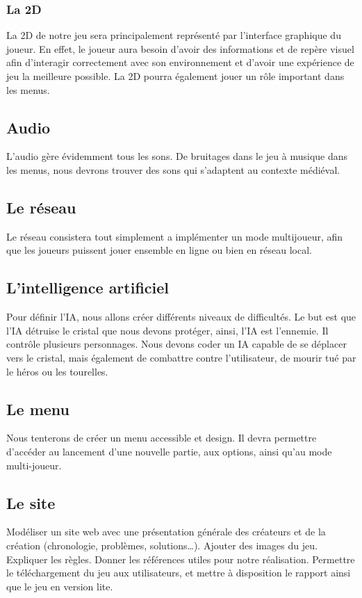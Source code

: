 \documentclass[a4paper, 12pt]{article}
\begin{document}
		\subsubsection{La 2D}
		La 2D de notre jeu sera principalement représenté par l'interface graphique du joueur. En effet, le joueur aura besoin d'avoir des informations et de repère visuel afin d'interagir correctement avec son environnement et d'avoir une expérience de jeu la meilleure possible. La 2D pourra également jouer un rôle important dans les menus.
	\subsection{Audio}
	L’audio gère évidemment tous les sons. De bruitages dans le jeu à musique dans les menus, nous devrons trouver des sons qui s’adaptent au contexte médiéval.

	\subsection{Le réseau}
	Le réseau consistera tout simplement a implémenter un mode multijoueur, afin que les joueurs puissent jouer ensemble en ligne ou bien en réseau local.
	\subsection{L'intelligence artificiel}
	Pour définir l’IA, nous allons créer différents niveaux de difficultés. Le but est que l’IA détruise le cristal que nous devons protéger, ainsi, l’IA est l’ennemie. Il contrôle plusieurs personnages. Nous devons coder un IA capable de se déplacer vers le cristal, mais également de combattre contre l’utilisateur, de mourir tué par le héros ou les tourelles. 

	\subsection{Le menu}
	Nous tenterons de créer un menu accessible et design. Il devra permettre d'accéder au lancement d’une nouvelle partie, aux options, ainsi qu’au mode multi-joueur. 
	\subsection{Le site}
	Modéliser un site web avec une présentation générale des créateurs et de la création (chronologie, problèmes, solutions…). Ajouter des images du jeu. Expliquer les règles.  Donner les références utiles pour notre réalisation. Permettre le téléchargement du jeu aux utilisateurs, et mettre à disposition le rapport ainsi que le jeu en version lite.
\end{document}
